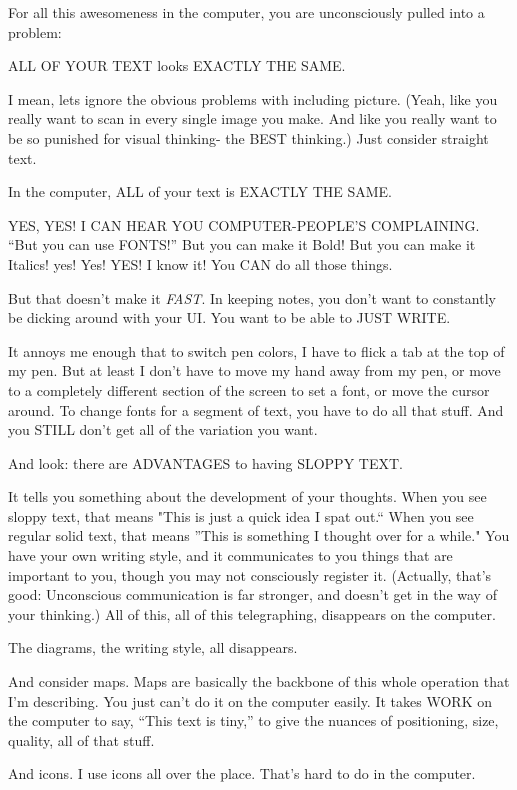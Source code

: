 \documentclass[oneside]{book}
\begin{document}
For all this awesomeness in the computer, you are unconsciously pulled
into a problem:

ALL OF YOUR TEXT looks EXACTLY THE SAME.

I mean, lets ignore the obvious problems with including
picture. (Yeah, like you really want to scan in every single image you
make. And like you really want to be so punished for visual thinking-
the BEST thinking.) Just consider straight text.

In the computer, ALL of your text is EXACTLY THE SAME.

YES, YES! I CAN HEAR YOU COMPUTER-PEOPLE'S COMPLAINING.
``But you can use FONTS!'' But you can make it Bold! But you can make it
Italics! yes! Yes! YES! I know it! You CAN do all those things.

But that doesn't make it \emph{FAST}. In keeping notes, you don't want to
constantly be dicking around with your UI. You want to be able to JUST
WRITE.

It annoys me enough that to switch pen colors, I have to flick a tab
at the top of my pen. But at least I don't have to move my hand away
from my pen, or move to a completely different section of the screen
to set a font, or move the cursor around. To change fonts for a
segment of text, you have to do all that stuff. And you STILL don't
get all of the variation you want.

And look: there are ADVANTAGES to having SLOPPY TEXT.

It tells you something about the development of your thoughts. When
you see sloppy text, that means "This is just a quick idea I spat
out.`` When you see regular solid text, that means ''This is something I
thought over for a while." You have your own writing style, and it
communicates to you things that are important to you, though you may
not consciously register it. (Actually, that's good: Unconscious
communication is far stronger, and doesn't get in the way of your
thinking.) All of this, all of this telegraphing, disappears on the
computer.

The diagrams, the writing style, all disappears.

And consider maps. Maps are basically the backbone of this whole
operation that I'm describing. You just can't do it on the computer
easily. It takes WORK on the computer to say, ``This text is tiny,'' to
give the nuances of positioning, size, quality, all of that stuff.

And icons. I use icons all over the place. That's hard to do in the
computer.
\end{document}
